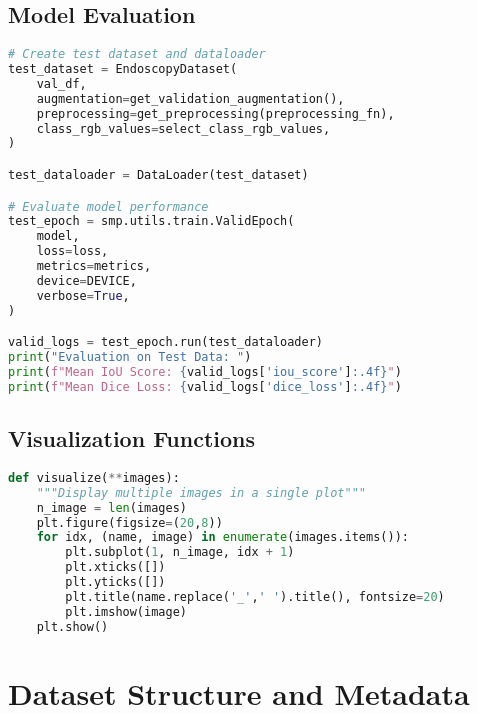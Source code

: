 \documentclass[12pt,a4paper]{report}
\begin{document}
\section{Model Evaluation}
\begin{lstlisting}[language=Python, caption=Model Evaluation]
# Create test dataset and dataloader
test_dataset = EndoscopyDataset(
    val_df,
    augmentation=get_validation_augmentation(),
    preprocessing=get_preprocessing(preprocessing_fn),
    class_rgb_values=select_class_rgb_values,
)

test_dataloader = DataLoader(test_dataset)

# Evaluate model performance
test_epoch = smp.utils.train.ValidEpoch(
    model,
    loss=loss,
    metrics=metrics,
    device=DEVICE,
    verbose=True,
)

valid_logs = test_epoch.run(test_dataloader)
print("Evaluation on Test Data: ")
print(f"Mean IoU Score: {valid_logs['iou_score']:.4f}")
print(f"Mean Dice Loss: {valid_logs['dice_loss']:.4f}")
\end{lstlisting}

\section{Visualization Functions}
\begin{lstlisting}[language=Python, caption=Visualization Utilities]
def visualize(**images):
    """Display multiple images in a single plot"""
    n_image = len(images)
    plt.figure(figsize=(20,8))
    for idx, (name, image) in enumerate(images.items()):
        plt.subplot(1, n_image, idx + 1)
        plt.xticks([])
        plt.yticks([])
        plt.title(name.replace('_',' ').title(), fontsize=20)
        plt.imshow(image)
    plt.show()
\end{lstlisting}

\chapter{Dataset Structure and Metadata}
\end{document}
